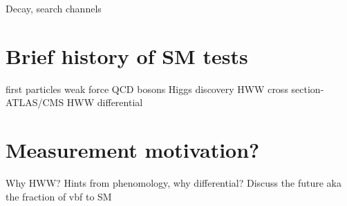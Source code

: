 Decay, search channels

\section{Brief history of SM tests}
first particles
weak force
QCD
bosons
Higgs discovery
HWW cross section- ATLAS/CMS
HWW differential
\section{Measurement motivation?}
Why HWW? 
Hints from phenomology, why differential? 
Discuss the future aka the fraction of vbf to SM

